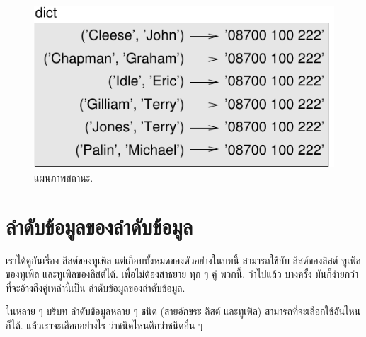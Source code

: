 \begin{figure}
\centerline
{\includegraphics[scale=0.8]{figs/dict2.pdf}}
\caption{แผนภาพสถานะ.}
\label{fig.dict2}
\end{figure}



\section{ลำดับข้อมูลของลำดับข้อมูล}

%

เราได้ดูกันเรื่อง ลิสต์ของทูเพิล
แต่เกือบทั้งหมดของตัวอย่างในบทนี้ สามารถใช้กับ ลิสต์ของลิสต์
ทูเพิลของทูเพิล และทูเพิลของลิสต์ได้.
เพื่อไม่ต้องสาธยาย ทุก ๆ คู่ พวกนี้. %
ว่าไปแล้ว บางครั้ง มันก็ง่ายกว่า ที่จะอ้างถึงคู่เหล่านี้เป็น ลำดับข้อมูลของลำดับข้อมูล.



ในหลาย ๆ บริบท ลำดับข้อมูลหลาย ๆ ชนิด (สายอักขระ ลิสต์ และทูเพิล)
สามารถที่จะเลือกใช้อันไหนก็ได้.
แล้วเราจะเลือกอย่างไร ว่าชนิดไหนดีกว่าชนิดอื่น ๆ
%


